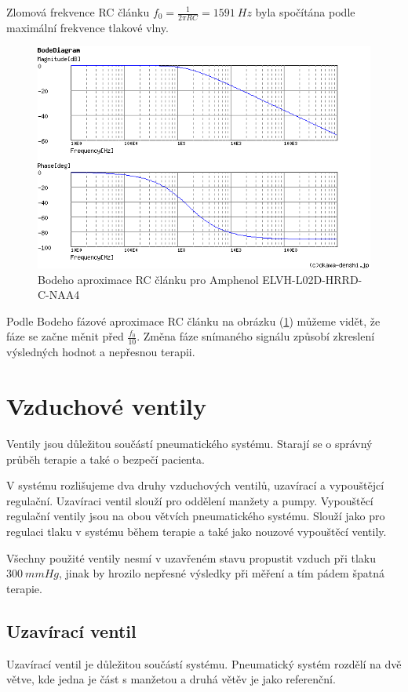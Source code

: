 \raggedbottom
Zlomová frekvence RC článku $f_0 = \frac{1}{2 \pi RC} = 1591 \ Hz $ byla spočítána podle maximální frekvence tlakové vlny.

\begin{figure}[H]
    \centering
    \includegraphics[width=0.9\linewidth]{pictures/rc_1k_100n_1591.png}
    \caption{Bodeho aproximace RC článku pro Amphenol ELVH-L02D-HRRD-C-NAA4}
    \label{fig:amphenol_filter}
\end{figure}

Podle Bodeho fázové aproximace RC článku na obrázku (\ref{fig:amphenol_filter}) můžeme vidět, že fáze se začne měnit před $\frac{f_0}{10}$.
Změna fáze snímaného signálu způsobí zkreslení výsledných hodnot a nepřesnou terapii.
\section{Vzduchové ventily}
Ventily jsou důležitou součástí pneumatického systému. Starají se o správný průběh terapie a také o bezpečí pacienta. \par
V systému rozlišujeme dva druhy vzduchových ventilů, uzavírací a vypouštějcí regulační. Uzavíraci ventil slouží pro oddělení manžety a pumpy. Vypouštěcí regulační ventily jsou na obou větvích pneumatického systému. Slouží jako pro regulaci tlaku v systému během terapie a také jako nouzové vypouštěcí ventily. \par
Všechny použité ventily nesmí v uzavřeném stavu propustit vzduch při tlaku $300 \ mmHg$, jinak by hrozilo nepřesné výsledky při měření a tím pádem špatná terapie.

\subsection{Uzavírací ventil}
Uzavírací ventil je důležitou součástí systému. Pneumatický systém rozdělí na dvě větve, kde jedna je část s manžetou a druhá větěv je jako referenční. \par

